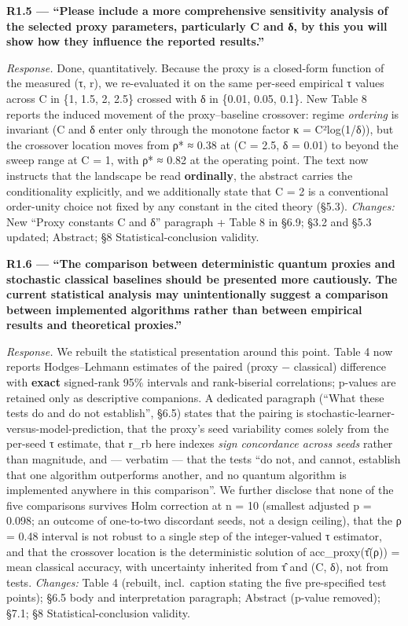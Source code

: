 \documentclass[
  11pt,
]{article}
\begin{document}
\textbf{R1.5 --- ``Please include a more comprehensive sensitivity
analysis of the selected proxy parameters, particularly C and δ, by this
you will show how they influence the reported results.''}

\emph{Response.} Done, quantitatively. Because the proxy is a
closed-form function of the measured (τ, r), we re-evaluated it on the
same per-seed empirical τ values across C in \{1, 1.5, 2, 2.5\} crossed
with δ in \{0.01, 0.05, 0.1\}. New Table 8 reports the induced movement
of the proxy--baseline crossover: regime \emph{ordering} is invariant (C
and δ enter only through the monotone factor κ = C²log(1/δ)), but the
crossover location moves from ρ* ≈ 0.38 at (C = 2.5, δ = 0.01) to beyond
the sweep range at C = 1, with ρ* ≈ 0.82 at the operating point. The
text now instructs that the landscape be read \textbf{ordinally}, the
abstract carries the conditionality explicitly, and we additionally
state that C = 2 is a conventional order-unity choice not fixed by any
constant in the cited theory (§5.3). \emph{Changes:} New ``Proxy
constants C and δ'' paragraph + Table 8 in §6.9; §3.2 and §5.3 updated;
Abstract; §8 Statistical-conclusion validity.

\textbf{R1.6 --- ``The comparison between deterministic quantum proxies
and stochastic classical baselines should be presented more cautiously.
The current statistical analysis may unintentionally suggest a
comparison between implemented algorithms rather than between empirical
results and theoretical proxies.''}

\emph{Response.} We rebuilt the statistical presentation around this
point. Table 4 now reports Hodges--Lehmann estimates of the paired
(proxy − classical) difference with \textbf{exact} signed-rank 95\%
intervals and rank-biserial correlations; p-values are retained only as
descriptive companions. A dedicated paragraph (``What these tests do and
do not establish'', §6.5) states that the pairing is
stochastic-learner-versus-model-prediction, that the proxy's seed
variability comes solely from the per-seed τ estimate, that r\_rb here
indexes \emph{sign concordance across seeds} rather than magnitude, and
--- verbatim --- that the tests ``do not, and cannot, establish that one
algorithm outperforms another, and no quantum algorithm is implemented
anywhere in this comparison''. We further disclose that none of the five
comparisons survives Holm correction at n = 10 (smallest adjusted p =
0.098; an outcome of one-to-two discordant seeds, not a design ceiling),
that the ρ = 0.48 interval is not robust to a single step of the
integer-valued τ estimator, and that the crossover location is the
deterministic solution of acc\_proxy(τ̂(ρ)) = mean classical accuracy,
with uncertainty inherited from τ̂ and (C, δ), not from tests.
\emph{Changes:} Table 4 (rebuilt, incl.~caption stating the five
pre-specified test points); §6.5 body and interpretation paragraph;
Abstract (p-value removed); §7.1; §8 Statistical-conclusion validity.
\end{document}
